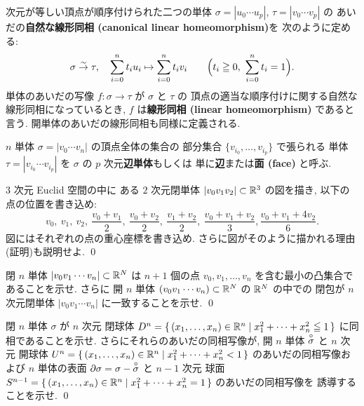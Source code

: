 \documentclass[12pt,twoside]{jarticle}
\begin{document}
次元が等しい頂点が順序付けられた二つの単体 %
$\sigma = |u_0\cdots u_p|$, $\tau = |v_0\cdots v_p|$ の
あいだの{\bf 自然な線形同相 (canonical linear homeomorphism)}を
次のように定める:
\begin{equation*}
  \sigma\overset\sim\rightarrow\tau,
  \quad 
  \sum_{i=0}^n t_i u_i 
  \mapsto
  \sum_{i=0}^n t_i v_i
  \qquad \Bigl(t_i\geqq 0,\ \sum_{i=0}^n t_i=1\Bigr).
\end{equation*}
単体のあいだの写像 $f:\sigma\to\tau$ が $\sigma$ と $\tau$ の
頂点の適当な順序付けに関する自然な線形同相になっているとき, 
$f$ は{\bf 線形同相 (linear homeomorphism)} であると言う.
開単体のあいだの線形同相も同様に定義される.

$n$ 単体 $\sigma=|v_0\cdots v_n|$ の頂点全体の集合の
部分集合 $\{v_{i_0},\ldots,v_{i_p}\}$ で張られる
単体 $\tau=|v_{i_0}\cdots v_{i_p}|$
を $\sigma$ の $p$ 次元{\bf 辺単体}もしくは
単に{\bf 辺}または{\bf 面 (face)} と呼ぶ.

\begin{question}
  $3$ 次元 Euclid 空間の中に
  ある $2$ 次元閉単体 $|v_0v_1v_2| \subset {\mathbb R}^3$ の図を描き,
  以下の点の位置を書き込め:
  \begin{equation*}
    v_0, \ v_1, \ v_2, \ %
    \frac{v_0+v_1}{2}, \ %
    \frac{v_0+v_2}{2}, \ %
    \frac{v_1+v_2}{2}, \ %
    \frac{v_0+v_1+v_2}{3}, %
    \frac{v_0+v_1+4v_2}{6}.
  \end{equation*}
  図にはそれぞれの点の重心座標を書き込め.
  さらに図がそのように描かれる理由(証明)も説明せよ.
  \qed
\end{question}

\begin{question}
 閉 $n$ 単体 $|v_0v_1\cdots v_n|\subset{\mathbb R}^N$ 
 は $n+1$ 個の点 $v_0,v_1,\ldots,v_n$ を含む最小の凸集合であることを示せ.
 さらに
 開 $n$ 単体 $(v_0v_1\cdots v_n)\subset{\mathbb R}^N$ の ${\mathbb R}^N$ の中での
 閉包が $n$ 次元閉単体 $|v_0v_1\cdots v_n|$ に一致することを示せ.
 \qed
\end{question}

\begin{question}
 閉 $n$ 単体 $\sigma$ が $n$ 次元
 閉球体 $D^n = \{\, (x_1,\ldots,x_n)\in{\mathbb R}^n
 \mid x_1^2+\cdots+x_n^2 \leqq 1 \,\}$ に同相であることを示せ.
 さらにそれらのあいだの同相写像が, 
 開 $n$ 単体 ${\overset{\circ}{\sigma}}$ と $n$ 次元
 開球体 $U^n = \{\, (x_1,\ldots,x_n)\in{\mathbb R}^n
 \mid x_1^2+\cdots+x_n^2 < 1 \,\}$ のあいだの同相写像および
 $n$ 単体の表面 $\partial\sigma = \sigma - {\overset{\circ}{\sigma}}$ と $n-1$ 次元
 球面 $S^{n-1} = \{\, (x_1,\ldots,x_n)\in{\mathbb R}^n
 \mid x_1^2+\cdots+x_n^2 = 1 \,\}$ のあいだの同相写像を
 誘導することを示せ. \qed
\end{question}
\end{document}
